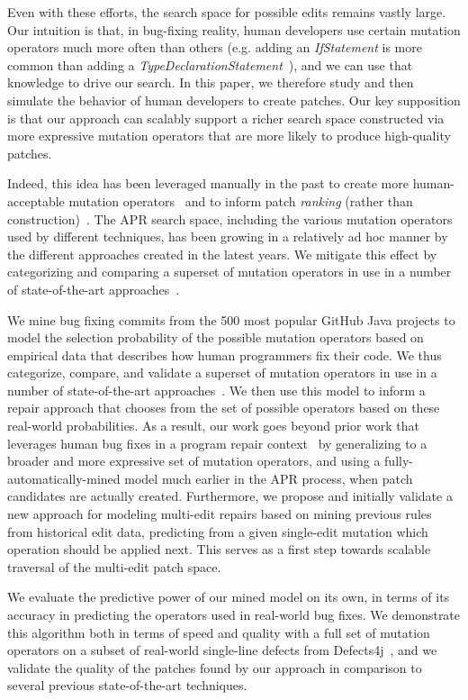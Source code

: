 \documentclass[conference]{IEEEtran}
\begin{document}
Even with these efforts, the search space for possible edits remains vastly large. Our intuition is that, in bug-fixing reality, human developers use certain mutation operators 
much more often than 
others (e.g. adding an \emph{IfStatement} is more common than adding a \emph{TypeDeclarationStatement}~\cite{Soto16}), and we can use that knowledge to drive our search. In this paper, we therefore study and then simulate the behavior of human
developers to create patches. Our key supposition is that our approach can scalably support a richer
search space constructed via more expressive mutation operators that are more
likely to produce high-quality patches.

Indeed, this idea has been
leveraged manually in the past to create more human-acceptable mutation
operators~\cite{kim2013} and to inform patch \emph{ranking} (rather than construction)~\cite{xuan16,long16proph}.
The APR search space, including the various mutation
operators used by different techniques, has been growing in a relatively ad hoc 
manner by the different approaches created in the latest years. We mitigate this effect by categorizing and comparing a superset of
mutation operators in use in a number of 
state-of-the-art approaches~\cite{legoues12,Weimer13,kim2013,long16proph}.

We mine bug fixing commits from 
the 500 most popular GitHub Java projects to model the selection probability of
the possible mutation operators based on 
empirical data that describes how human programmers fix their code.  We thus
categorize, compare, and validate a superset of
mutation operators in use in a number of 
state-of-the-art approaches~\cite{legoues12,Weimer13,kim2013,long16proph}. We then use this
model to inform a repair approach that chooses from the set of possible
operators based on these real-world
probabilities.
As a result, our work goes beyond prior work that leverages human bug
fixes in a program repair context~\cite{kim2013,xuan16,long16proph} by generalizing
to a broader and more expressive set of
mutation operators, and using a fully-automatically-mined model much 
earlier in the APR process, when
patch candidates are actually created.  
Furthermore, we propose and initially validate a new approach for modeling
multi-edit repairs based on mining previous rules from historical edit data, 
predicting from a given 
single-edit mutation which operation should be applied
next.  This serves  as a first step towards
scalable traversal of the multi-edit patch space. 


We evaluate the predictive power of our mined model on its own, in terms of its
accuracy in predicting the operators used in real-world bug fixes. We demonstrate this algorithm both in terms of speed and quality with a full set of mutation
operators on a subset of real-world single-line defects
from Defects4j~\cite{just14}, and we validate the quality of the patches found by our approach
in comparison to several previous state-of-the-art techniques. 
\end{document}

